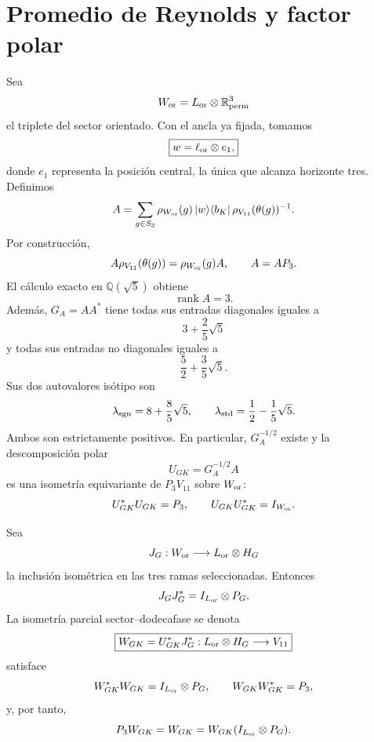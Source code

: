 \section{Promedio de Reynolds y factor polar}

Sea
\[
 W_{\rm or}=L_{\rm or}\otimes\mathbb R^3_{\rm perm}
\]
el triplete del sector orientado. Con el ancla ya fijada, tomamos
\[
 \boxed{w=\ell_{\rm or}\otimes e_1,}
\]
donde \(e_1\) representa la posición central, la única que alcanza horizonte
tres. Definimos
\[
 A
 =\sum_{g\in S_3}
 \rho_{W_{\rm or}}(g)\,
 |w\rangle\langle b_K|\,
 \rho_{V_{11}}(\theta(g))^{-1}.
\]
Por construcción,
\[
 A\rho_{V_{11}}(\theta(g))
 =\rho_{W_{\rm or}}(g)A,
\qquad
 A=AP_3.
\]
El cálculo exacto en \(\mathbb Q(\sqrt5)\) obtiene
\[
 \operatorname{rank}A=3.
\]
Además, \(G_A=AA^*\) tiene todas sus entradas diagonales iguales a
\[
 3+\frac25\sqrt5
\]
y todas sus entradas no diagonales iguales a
\[
 \frac52+\frac35\sqrt5.
\]
Sus dos autovalores isótipo son
\[
 \lambda_{\rm sgn}=8+\frac85\sqrt5,
 \qquad
 \lambda_{\rm std}=\frac12-\frac15\sqrt5.
\]
Ambos son estrictamente positivos. En particular, \(G_A^{-1/2}\) existe y
la descomposición polar
\[
 \boxed{U_{GK}=G_A^{-1/2}A}
\]
es una isometría equivariante de \(P_3V_{11}\) sobre \(W_{\rm or}\):
\[
 U_{GK}^*U_{GK}=P_3,
 \qquad
 U_{GK}U_{GK}^*=I_{W_{\rm or}}.
\]

Sea
\[
 J_G:W_{\rm or}\longrightarrow L_{\rm or}\otimes H_G
\]
la inclusión isométrica en las tres ramas seleccionadas. Entonces
\[
 J_GJ_G^*=I_{L_{\rm or}}\otimes P_G.
\]
La isometría parcial sector--dodecafase se denota
\[
 \boxed{
 W_{GK}=U_{GK}^*J_G^*
 :L_{\rm or}\otimes H_G\longrightarrow V_{11}
 }
\]
satisface
\[
 W_{GK}^*W_{GK}
 =I_{L_{\rm or}}\otimes P_G,
\qquad
 W_{GK}W_{GK}^*=P_3,
\]
y, por tanto,
\[
 P_3W_{GK}
 =W_{GK}
 =W_{GK}(I_{L_{\rm or}}\otimes P_G).
\]

